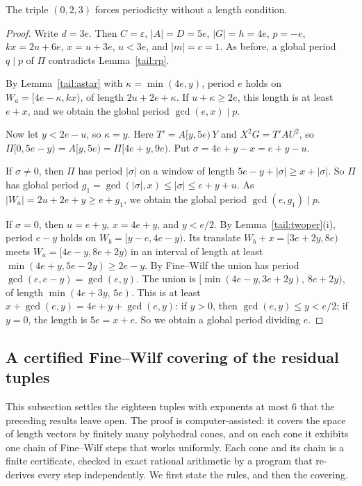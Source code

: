 \begin{theorem}\label{tail:023}
The triple \((0,2,3)\) forces periodicity without a length condition.
\end{theorem}
\begin{proof}
Write \(d=3e\). Then \(C=\varepsilon\), \(|A|=D=5e\), \(|G|=h=4e\), \(p=-e\), \(kx=2u+6e\), \(x=u+3e\), \(u<3e\), and \(|m|=c=1\). As before, a global period \(q\mid p\) of \(\Pi\) contradicts Lemma~\ref{tail:rp}.

By Lemma~\ref{tail:astar} with \(\kappa=\min(4e,y)\), period \(e\) holds on \(W_a=[4e-\kappa,kx)\), of length \(2u+2e+\kappa\). If \(u+\kappa\ge2e\), this length is at least \(e+x\), and we obtain the global period \(\gcd(e,x)\mid p\).

Now let \(y<2e-u\), so \(\kappa=y\). Here \(T'=A[y,5e)\,Y\) and \(X^2G=T'AU^2\), so \(\Pi[0,5e-y)=A[y,5e)=\Pi[4e+y,9e)\). Put \(\sigma=4e+y-x=e+y-u\).

If \(\sigma\ne0\), then \(\Pi\) has period \(|\sigma|\) on a window of length \(5e-y+|\sigma|\ge x+|\sigma|\). So \(\Pi\) has global period \(g_1=\gcd(|\sigma|,x)\le|\sigma|\le e+y+u\). As \(|W_a|=2u+2e+y\ge e+g_1\), we obtain the global period \(\gcd(e,g_1)\mid p\).

If \(\sigma=0\), then \(u=e+y\), \(x=4e+y\), and \(y<e/2\). By Lemma~\ref{tail:twoper}(i), period \(e-y\) holds on \(W_b=[y-e,4e-y)\). Its translate \(W_b+x=[3e+2y,8e)\) meets \(W_a=[4e-y,8e+2y)\) in an interval of length at least \(\min(4e+y,5e-2y)\ge2e-y\). By Fine--Wilf the union has period \(\gcd(e,e-y)=\gcd(e,y)\). The union is \([\min(4e-y,3e+2y),\,8e+2y)\), of length \(\min(4e+3y,\,5e)\). This is at least \(x+\gcd(e,y)=4e+y+\gcd(e,y)\): if \(y>0\), then \(\gcd(e,y)\le y<e/2\); if \(y=0\), the length is \(5e=x+e\). So we obtain a global period dividing \(e\).
\end{proof}

\subsection{A certified Fine--Wilf covering of the residual tuples}\label{tail:cert-sec}

This subsection settles the eighteen tuples with exponents at most \(6\) that the preceding results leave open. The proof is computer-assisted: it covers the space of length vectors by finitely many polyhedral cones, and on each cone it exhibits one chain of Fine--Wilf steps that works uniformly. Each cone and its chain is a finite certificate, checked in exact rational arithmetic by a program that re-derives every step independently. We first state the rules, and then the covering.

